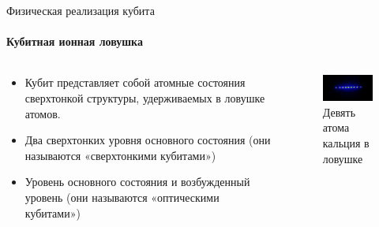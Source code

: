 \documentclass{beamer}
\begin{document}



    \begin{frame}{Физическая реализация кубита}
    \framesubtitle{Кубитная ионная ловушка}

        \begin{columns}

        \begin{column}{0.6\textwidth}

            \begin{itemize}
                \item Кубит представляет собой атомные состояния сверхтонкой структуры, удерживаемых в ловушке атомов. 
                \item Два сверхтонких уровня основного состояния (они называются «сверхтонкими кубитами»)
                \item Уровень основного состояния и возбужденный уровень (они называются «оптическими кубитами»)
            \end{itemize}

        \end{column}

        \begin{column}{0.4\textwidth}
            \begin{figure}
                \centering
                \includegraphics[width=\textwidth]{media/nine-calcium-ions.jpg}
                \caption{Девять атома кальция в ловушке}
            \end{figure}
        \end{column}

        \end{columns}

    \end{frame}
    
\end{document}

